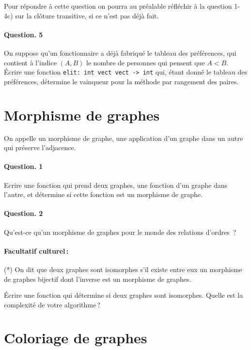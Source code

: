 \documentclass[10pt,a4paper]{article}
\begin{document}
Pour répondre à cette question on pourra au préalable réfléchir à la question 
1-4c) sur la clôture transitive, si ce n'est pas déjà fait.

\paragraph{Question. 5\\}
On suppose qu'un fonctionnaire a déjà fabriqué le tableau
des préférences, qui contient à l'indice $(A,B)$ le nombre de personnes qui 
pensent que $A<B$. Écrire une fonction \texttt{elit: int vect vect -> int} qui, 
étant donné le tableau des préférences, détermine le vainqueur pour la méthode 
par rangement des paires.

\section{Morphisme de graphes}
On appelle un morphisme de graphe, une application d'un graphe dans un
autre qui préserve l'adjacence.

\paragraph{Question. 1\\} Ecrire une fonction qui prend deux graphes,
une fonction d'un graphe dans l'autre, et détermine si cette fonction est
un morphisme de graphe. 

\paragraph{Question. 2\\}
Qu'est-ce qu'un morphisme de graphes pour le monde des relations d'ordres~?

\paragraph{Facultatif culturel\,:\\}
(*) On dit que deux graphes sont isomorphes s'il 
existe entre eux un morphisme de graphes bijectif dont l'inverse est un 
morphisme de graphes.

Écrire une fonction qui détermine si deux graphes
sont isomorphes. Quelle est la complexité de votre algorithme\,?

\section{Coloriage de graphes}
\end{document}

